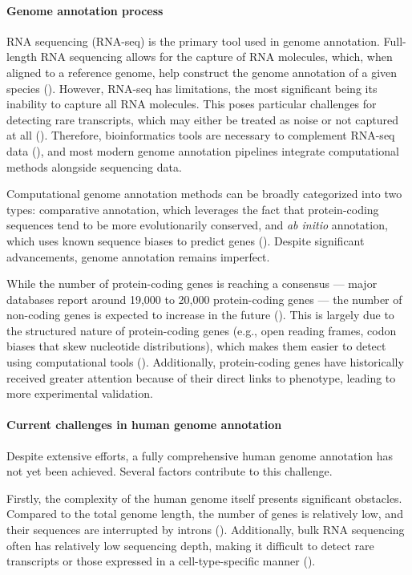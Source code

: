 \paragraph{Genome annotation process}

RNA sequencing (RNA-seq) is the primary tool used in genome annotation.
Full-length RNA sequencing allows for the capture of RNA molecules, which, when aligned to a reference genome,
help construct the genome annotation of a given species (\cite{Salzberg2019}).
However, RNA-seq has limitations, the most significant being its inability to capture all RNA molecules.
This poses particular challenges for detecting rare transcripts, which may either be treated as noise or not captured at all (\cite{Salzberg2019}).
Therefore, bioinformatics tools are necessary to complement RNA-seq data (\cite{Guigo2023}),
and most modern genome annotation pipelines integrate computational methods alongside sequencing data.

Computational genome annotation methods can be broadly categorized into two types:
comparative annotation, which leverages the fact that protein-coding sequences tend to be more evolutionarily conserved,
and \textit{ab initio} annotation, which uses known sequence biases to predict genes (\cite{Guigo2023}).
Despite significant advancements, genome annotation remains imperfect.

While the number of protein-coding genes is reaching a consensus — major databases report around 19,000 to 20,000 protein-coding genes — 
the number of non-coding genes is expected to increase in the future (\cite{Amaral2023}).
This is largely due to the structured nature of protein-coding genes (e.g., open reading frames, codon biases that skew nucleotide distributions),
which makes them easier to detect using computational tools (\cite{Guigo2023}).
Additionally, protein-coding genes have historically received greater attention because of their direct links to phenotype,
leading to more experimental validation.

\paragraph{Current challenges in human genome annotation}

Despite extensive efforts, a fully comprehensive human genome annotation has not yet been achieved.
Several factors contribute to this challenge.

Firstly, the complexity of the human genome itself presents significant obstacles.
Compared to the total genome length, the number of genes is relatively low, and their sequences are interrupted by introns (\cite{Salzberg2019}).
Additionally, bulk RNA sequencing often has relatively low sequencing depth,
making it difficult to detect rare transcripts or those expressed in a cell-type-specific manner (\cite{Guigo2023}).

